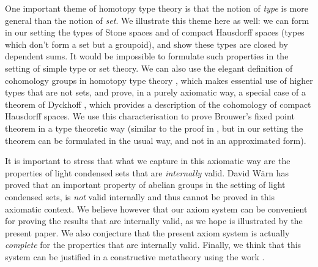 One important theme of homotopy type theory is that the notion of {\em type} is more general than the notion of {\em set}. We illustrate
this theme here as well: we can form in our setting the types of Stone spaces and of compact Hausdorff spaces
(types which don't form a set but a groupoid),
and show these types are
closed by dependent sums. It would be impossible to formulate such properties in the setting of simple type or set theory.
We can also use the elegant definition of cohomology groups in homotopy type theory \cite{hott}, which makes essential
use of higher types that are not sets, and prove, in a purely axiomatic way,
a special case of a theorem of Dyckhoff \cite{dyckhoff76}, which provides
a description of the cohomology of compact Hausdorff spaces. We use this characterisation to prove Brouwer's fixed point theorem
in a type theoretic way (similar to the proof in \cite{shulman-Brouwer-fixed-point}, but
in our setting the theorem can be formulated in the usual
way, and not in an approximated form).

It is important to stress that what we capture in this axiomatic way are the properties of light condensed
sets that are {\em internally} valid. David W\"arn \cite{warn2024} has proved that an important property of abelian
groups in the setting of light condensed sets, is {\em not} valid internally and thus cannot be proved in this axiomatic context.
We believe however that our axiom system can be convenient for proving the results that are internally valid, as we hope
is illustrated by the present paper. We also conjecture that the present axiom system is actually {\em complete}
for the properties that are internally valid. Finally, we think that this system can be justified in a constructive metatheory
using the work \cite{CRS21}.
